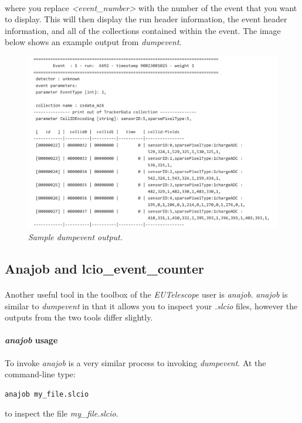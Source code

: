 \documentclass[11pt]{article}
\begin{document}
\paragraph{}
where you replace \textit{\textless event\_number\textgreater} with the number of the event that you want to display. This will then display the run header information, the event header information, and all of the collections contained within the event. The image below shows an example output from \textit{dumpevent}.
\pagebreak
\begin{figure}[!ht]
	\centering
	\includegraphics[scale=0.4]{dumpevent.png}
	\caption{\textit{Sample dumpevent output.}}
\end{figure}

\subsection{Anajob and lcio\_event\_counter}
\paragraph{}
Another useful tool in the toolbox of the \textit{EUTelescope} user is \textit{anajob}. \textit{anajob} is similar to \textit{dumpevent} in that it allows you to inspect your \textit{.slcio} files, however the outputs from the two tools differ slightly.
\paragraph{\textit{anajob} usage}
To invoke \textit{anajob} is a very similar process to invoking \textit{dumpevent}. At the command-line type:
\begin{verbatim}
anajob my_file.slcio
\end{verbatim}
to inspect the file \textit{my\_file.slcio}.
\end{document}
